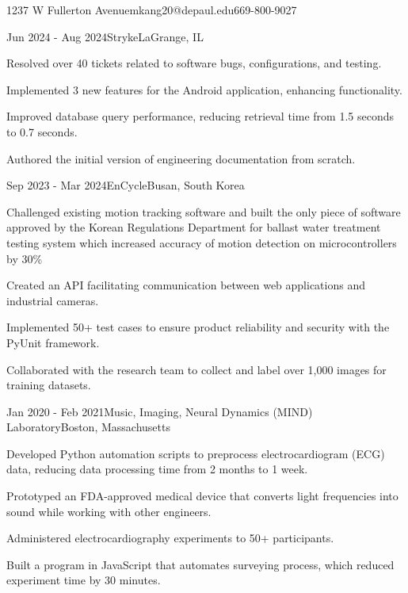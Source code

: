 \documentclass{resume}
\begin{document}
\begin{Introduction}{1237 W Fullerton Avenue}{mkang20@depaul.edu}{669-800-9027}
\end{Introduction}

\begin{Section}[Experience]
\begin{Experience}{Jun 2024 - Aug 2024}{Stryke}{LaGrange, IL} \item Resolved over 40 tickets related to software bugs, configurations, and testing. \item Implemented 3 new features for the Android application, enhancing functionality. \item Improved database query performance, reducing retrieval time from 1.5 seconds to 0.7 seconds. \item Authored the initial version of engineering documentation from scratch. 
\end{Experience}

\begin{Experience}{Sep 2023 - Mar 2024}{EnCycle}{Busan, South Korea}
\item Challenged existing motion tracking software and built the only piece of software approved by the Korean Regulations Department for ballast water treatment testing system which increased accuracy of motion detection on microcontrollers by 30\%
\item Created an API facilitating communication between web applications and industrial cameras. 
\item Implemented 50+ test cases to ensure product reliability and security with the PyUnit framework.
\item Collaborated with the research team to collect and label over 1,000 images for training datasets. 
\end{Experience}

\begin{Experience}{Jan 2020 - Feb 2021}{Music, Imaging, Neural Dynamics (MIND) Laboratory}{Boston, Massachusetts}
\item Developed Python automation scripts to preprocess electrocardiogram (ECG) data, reducing data processing time from 2 months to 1 week. 
\item Prototyped an FDA-approved medical device that converts light frequencies into sound while working with other engineers. 
\item Administered electrocardiography experiments to 50+ participants.
\item Built a program in JavaScript that automates surveying process, which reduced experiment time by 30 minutes.
\end{Experience}
\end{Section}
\end{document}
